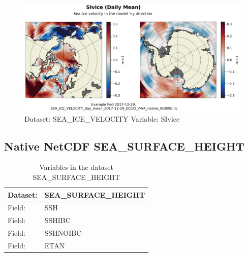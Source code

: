 \begin{figure}[H]
\centering
\includegraphics[scale=0.55]{../images/plots/native_plots/Sea-Ice_Velocity/SIvice.png}
\caption{Dataset: SEA\_ICE\_VELOCITY Variable: SIvice}
\label{tab:table-SEA_ICE_VELOCITY_SIvice-Plot}
\end{figure}
\pagebreak
\subsection{Native NetCDF SEA\_SURFACE\_HEIGHT}
\newp
\begin{longtable}{|p{}|p{}|}
\caption{Variables in the dataset SEA\_SURFACE\_HEIGHT}
\label{tab:table-SEA_SURFACE_HEIGHT-fields} \\ 
\hline \endhead \hline \endfoot
\rowcolor{lightgray} \textbf{Dataset:} & \textbf{SEA\_SURFACE\_HEIGHT} \\ \hline
Field: &SSH \\ \hline
Field: &SSHIBC \\ \hline
Field: &SSHNOIBC \\ \hline
Field: &ETAN \\ \hline
\end{longtable}

\pagebreak
